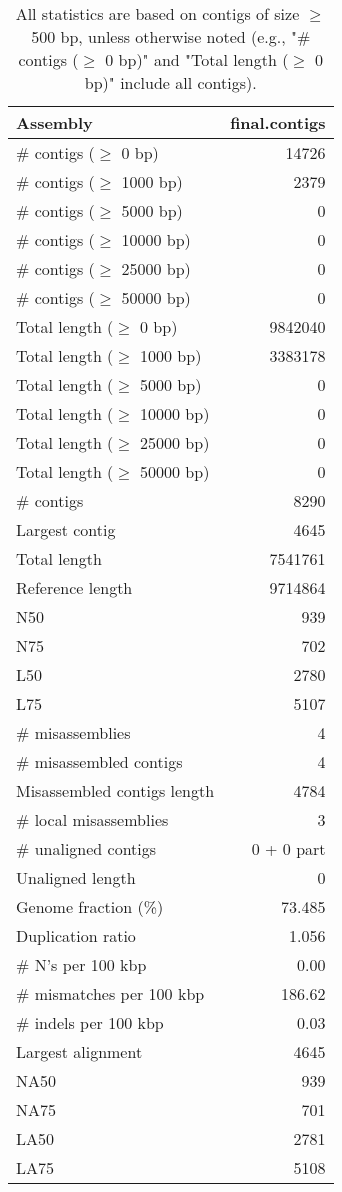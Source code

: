\documentclass[12pt,a4paper]{article}
\begin{document}
\begin{table}[ht]
\begin{center}
\caption{All statistics are based on contigs of size $\geq$ 500 bp, unless otherwise noted (e.g., "\# contigs ($\geq$ 0 bp)" and "Total length ($\geq$ 0 bp)" include all contigs).}
\begin{tabular}{|l*{1}{|r}|}
\hline
Assembly & final.contigs \\ \hline
\# contigs ($\geq$ 0 bp) & 14726 \\ \hline
\# contigs ($\geq$ 1000 bp) & 2379 \\ \hline
\# contigs ($\geq$ 5000 bp) & 0 \\ \hline
\# contigs ($\geq$ 10000 bp) & 0 \\ \hline
\# contigs ($\geq$ 25000 bp) & 0 \\ \hline
\# contigs ($\geq$ 50000 bp) & 0 \\ \hline
Total length ($\geq$ 0 bp) & 9842040 \\ \hline
Total length ($\geq$ 1000 bp) & 3383178 \\ \hline
Total length ($\geq$ 5000 bp) & 0 \\ \hline
Total length ($\geq$ 10000 bp) & 0 \\ \hline
Total length ($\geq$ 25000 bp) & 0 \\ \hline
Total length ($\geq$ 50000 bp) & 0 \\ \hline
\# contigs & 8290 \\ \hline
Largest contig & 4645 \\ \hline
Total length & 7541761 \\ \hline
Reference length & 9714864 \\ \hline
N50 & 939 \\ \hline
N75 & 702 \\ \hline
L50 & 2780 \\ \hline
L75 & 5107 \\ \hline
\# misassemblies & 4 \\ \hline
\# misassembled contigs & 4 \\ \hline
Misassembled contigs length & 4784 \\ \hline
\# local misassemblies & 3 \\ \hline
\# unaligned contigs & 0 + 0 part \\ \hline
Unaligned length & 0 \\ \hline
Genome fraction (\%) & 73.485 \\ \hline
Duplication ratio & 1.056 \\ \hline
\# N's per 100 kbp & 0.00 \\ \hline
\# mismatches per 100 kbp & 186.62 \\ \hline
\# indels per 100 kbp & 0.03 \\ \hline
Largest alignment & 4645 \\ \hline
NA50 & 939 \\ \hline
NA75 & 701 \\ \hline
LA50 & 2781 \\ \hline
LA75 & 5108 \\ \hline
\end{tabular}
\end{center}
\end{table}
\end{document}
